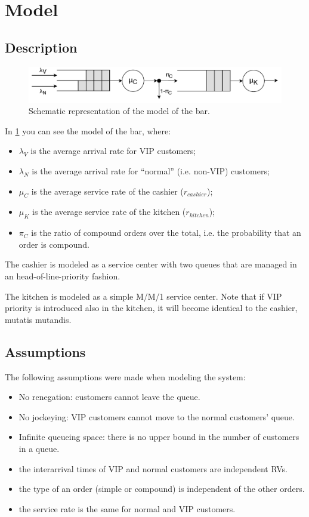 \section{Model}

\subsection{Description}
\begin{figure}[h!]
    \centering
    \includegraphics[width=\textwidth]{figs/qt_model.pdf}
    \caption{Schematic representation of the model of the bar.}
    \label{fig:model}
\end{figure}

In \cref{fig:model} you can see the model of the bar, where:
\begin{itemize}
    \item $\lambda_V$ is the average arrival rate for VIP customers;
    \item $\lambda_N$ is the average arrival rate for ``normal'' (i.e. non-VIP) customers;
    \item $\mu_C$ is the average service rate of the cashier ($r_{cashier}$);
    \item $\mu_K$ is the average service rate of the kitchen ($r_{kitchen}$);
    \item $\pi_C$ is the ratio of compound orders over the total, i.e. the 
        probability that an order is compound.
\end{itemize}

The cashier is modeled as a service center with two queues that are managed 
in an head-of-line-priority fashion.

The kitchen is modeled as a simple M/M/1 service center. Note that if VIP 
priority is introduced also in the kitchen, it will become identical to the 
cashier, mutatis mutandis.

\subsection{Assumptions}
The following assumptions were made when modeling the system:
\begin{itemize}
    \item No renegation: customers cannot leave the queue.
    \item No jockeying: VIP customers cannot move to the normal customers' queue.
    \item Infinite queueing space: there is no upper bound in the number of 
        customers in a queue.
    \item the interarrival times of VIP and normal customers are independent 
        RVs.
    \item the type of an order (simple or compound) is independent of the other
        orders.
    \item the service rate is the same for normal and VIP customers.
\end{itemize}

